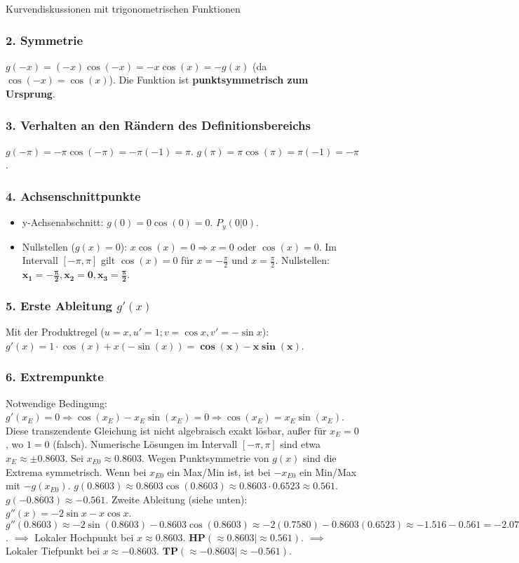 \begin{loesungsumgebung}{Kurvendiskussionen mit trigonometrischen Funktionen}
\begin{enumerate}[label=(\alph*)]
    \subsubsection*{2. Symmetrie}
    $g(-x) = (-x)\cos(-x) = -x\cos(x) = -g(x)$ (da $\cos(-x)=\cos(x)$).
    Die Funktion ist \textbf{punktsymmetrisch zum Ursprung}.

    \subsubsection*{3. Verhalten an den Rändern des Definitionsbereichs}
    $g(-\pi) = -\pi \cos(-\pi) = -\pi(-1) = \pi$.
    $g(\pi) = \pi \cos(\pi) = \pi(-1) = -\pi$.

    \subsubsection*{4. Achsenschnittpunkte}
    \begin{itemize}
        \item y-Achsenabschnitt: $g(0) = 0 \cos(0) = 0$. $P_y(0|0)$.
        \item Nullstellen ($g(x)=0$): $x\cos(x)=0 \Rightarrow x=0$ oder $\cos(x)=0$.
        Im Intervall $[-\pi, \pi]$ gilt $\cos(x)=0$ für $x=-\frac{\pi}{2}$ und $x=\frac{\pi}{2}$.
        Nullstellen: $\mathbf{x_1=-\frac{\pi}{2}, x_2=0, x_3=\frac{\pi}{2}}$.
    \end{itemize}

    \subsubsection*{5. Erste Ableitung $g'(x)$}
    Mit der Produktregel ($u=x, u'=1; v=\cos x, v'=-\sin x$):
    $g'(x) = 1 \cdot \cos(x) + x(-\sin(x)) = \mathbf{\cos(x) - x\sin(x)}$.

    \subsubsection*{6. Extrempunkte}
    Notwendige Bedingung: $g'(x_E)=0 \Rightarrow \cos(x_E) - x_E\sin(x_E) = 0 \Rightarrow \cos(x_E) = x_E\sin(x_E)$.
    Diese transzendente Gleichung ist nicht algebraisch exakt lösbar, außer für $x_E=0$, wo $1=0$ (falsch).
    Numerische Lösungen im Intervall $[-\pi, \pi]$ sind etwa $x_E \approx \pm 0.8603$. Sei $x_{E0} \approx 0.8603$.
    Wegen Punktsymmetrie von $g(x)$ sind die Extrema symmetrisch. Wenn bei $x_{E0}$ ein Max/Min ist, ist bei $-x_{E0}$ ein Min/Max mit $-g(x_{E0})$.
    $g(0.8603) \approx 0.8603 \cos(0.8603) \approx 0.8603 \cdot 0.6523 \approx 0.561$.
    $g(-0.8603) \approx -0.561$.
    Zweite Ableitung (siehe unten): $g''(x) = -2\sin x - x\cos x$.
    $g''(0.8603) \approx -2\sin(0.8603) - 0.8603\cos(0.8603) \approx -2(0.7580) - 0.8603(0.6523) \approx -1.516 - 0.561 = -2.077 < 0$.
    $\implies$ Lokaler Hochpunkt bei $x \approx 0.8603$. $\mathbf{HP(\approx 0.8603 | \approx 0.561)}$.
    $\implies$ Lokaler Tiefpunkt bei $x \approx -0.8603$. $\mathbf{TP(\approx -0.8603 | \approx -0.561)}$.


\end{enumerate}
\end{loesungsumgebung}
